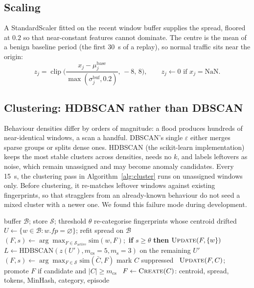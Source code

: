 \documentclass[conference]{IEEEtran}
\begin{document}
\subsection{Scaling}
A StandardScaler fitted on the recent window buffer supplies the spread, floored at $0.2$ so that near-constant features cannot dominate. The centre is the mean of a benign baseline period (the first 30~s of a replay), so normal traffic sits near the origin:
\begin{equation}
z_j=\operatorname{clip}\!\Big(\frac{x_j-\mu^{\mathrm{base}}_j}{\max(\sigma^{\mathrm{buf}}_j,0.2)},\,-8,\,8\Big),\qquad z_j\gets0\text{ if }x_j=\mathrm{NaN}.
\end{equation}

\subsection{Clustering: HDBSCAN rather than DBSCAN}
Behaviour densities differ by orders of magnitude: a flood produces hundreds of near-identical windows, a scan a handful. DBSCAN's single $\varepsilon$ either merges sparse groups or splits dense ones. HDBSCAN (the scikit-learn implementation) keeps the most stable clusters across densities, needs no $k$, and labels leftovers as noise, which remain unassigned and may become anomaly candidates. Every 15~s, the clustering pass in Algorithm~\ref{alg:cluster} runs on unassigned windows only. Before clustering, it re-matches leftover windows against existing fingerprints, so that stragglers from an already-known behaviour do not seed a mixed cluster with a newer one. We found this failure mode during development.

\begin{algorithm}[t]
\caption{Clustering pass and fingerprint placement}\label{alg:cluster}
\small
\begin{algorithmic}[1]
\Require buffer $\mathcal B$; store $\mathcal S$; threshold $\theta$
\State re-categorise fingerprints whose centroid drifted
\State $U\gets\{w\in\mathcal B: w.\mathit{fp}=\varnothing\}$; refit spread on $\mathcal B$
 
  \State $(F,s)\gets\arg\max_{F\in\mathcal S_{\mathrm{active}}}\mathrm{sim}(w,F)$;\ \textbf{if} $s\ge\theta$ \textbf{then} $\textsc{Update}(F,\{w\})$
\EndFor
\State $L\gets\mathrm{HDBSCAN}(z(U'), m_{\mathrm{cs}}{=}5, m_{\mathrm{s}}{=}3)$ on the remaining $U'$
  \State $(F,s)\gets\arg\max_{F\in\mathcal S}\mathrm{sim}(\bar C, F)$ 
     mark $C$ suppressed
    \Else\ $\textsc{Update}(F,C)$; promote $F$ if candidate and $|C|\ge m_{\mathrm{cs}}$ \EndIf
  \Else\ $F\gets\textsc{Create}(C)$: centroid, spread, tokens, MinHash, category, episode
  \EndIf
\EndFor
\end{algorithmic}
\end{algorithm}
\end{document}
